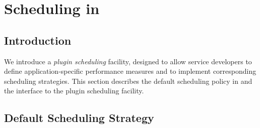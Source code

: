 

\newenvironment{code}
{\begin{list}{}{\setlength{\leftmargin}{1em}}\item\bfseries\tt}
{\end{list}}

\newenvironment{tinycode}
{\begin{list}{}{\setlength{\leftmargin}{1em}}\item\tiny\bfseries\tt}
{\end{list}}


\chapter{Scheduling in \diet}
\label{ch:plugin}

\section{Introduction}

We introduce a \emph{plugin scheduling} facility, designed to allow \diet
service developers to define application-specific performance measures and to
implement corresponding scheduling strategies. This section describes the
default scheduling policy in \diet and the interface to the plugin scheduling
facility.

\section{Default Scheduling Strategy}\label{sect:default_sched}

